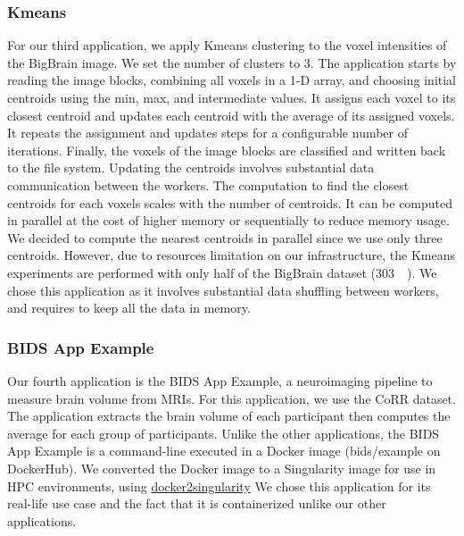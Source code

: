 \documentclass[AMA,STIX1COL]{WileyNJD-v2}
\newcommand{\HL}[1]{#1}
\begin{document}
\subsubsection{Kmeans}
For our third application, we apply Kmeans clustering to the voxel
intensities of the BigBrain image. We set the number of clusters to 3. The
application starts by reading the image blocks, combining all voxels in a
1-D array, and choosing initial centroids using the min, max, and
intermediate values. It assigns each voxel to its closest centroid and
updates each centroid with the average of its assigned voxels. It repeats
the assignment and updates steps for a configurable number of iterations.
Finally, the voxels of the image blocks are classified and written back to
the file system. Updating the centroids involves substantial data
communication between the workers.
The computation to find the closest centroids for each voxels scales with the number of centroids.
It can be computed in parallel at the cost of higher memory or sequentially to reduce memory usage.
We decided to compute the nearest centroids in parallel since we use only three centroids.
However, due to resources limitation on our infrastructure, the Kmeans experiments
are performed with only half of the BigBrain dataset ({\SI{303}{\gibi\byte}}).
\HL{We chose this application as it involves substantial data shuffling between workers,
and requires to keep all the data in memory.}
								
\subsubsection{BIDS App Example}
Our fourth application is the BIDS App Example, a neuroimaging pipeline to
measure brain volume from MRIs. For this application, we use the CoRR
dataset. The application extracts the brain volume of each participant
then computes the average for each group of participants. Unlike the other
applications, the BIDS App Example is a command-line executed in a Docker image
(bids/example on DockerHub). We converted the Docker image to a Singularity
image for use in HPC environments, using
\href{https://hub.docker.com/r/singularityware/docker2singularity/tags/}{docker2singularity}
\HL{We chose this application for its real-life use case and the fact that it is containerized unlike our other applications.}
										
\end{document}
